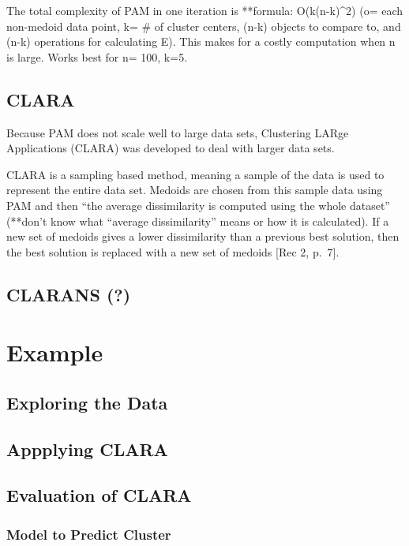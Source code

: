 \documentclass[12pt,twoside]{amherstthesis}
\begin{document}
  The total complexity of PAM in one iteration is **formula:
  O(k(n-k)\^{}2) (o= each non-medoid data point, k= \# of cluster centers,
  (n-k) objects to compare to, and (n-k) operations for calculating E).
  This makes for a costly computation when n is large. Works best for n=
  100, k=5.
  
  \section{CLARA}\label{clara}
  
  Because PAM does not scale well to large data sets, Clustering LARge
  Applications (CLARA) was developed to deal with larger data sets.
  
  CLARA is a sampling based method, meaning a sample of the data is used
  to represent the entire data set. Medoids are chosen from this sample
  data using PAM and then ``the average dissimilarity is computed using
  the whole dataset'' (**don't know what ``average dissimilarity'' means
  or how it is calculated). If a new set of medoids gives a lower
  dissimilarity than a previous best solution, then the best solution is
  replaced with a new set of medoids {[}Rec 2, p.~7{]}.
  
  \section{CLARANS (?)}\label{clarans}
  
  \chapter{Example}\label{typeset-equ}
  
  \section{Exploring the Data}\label{exploring-the-data}
  
  \section{Appplying CLARA}\label{appplying-clara}
  
  \section{Evaluation of CLARA}\label{evaluation-of-clara}
  
  \subsection{Model to Predict Cluster}\label{model-to-predict-cluster}
  
\end{document}
